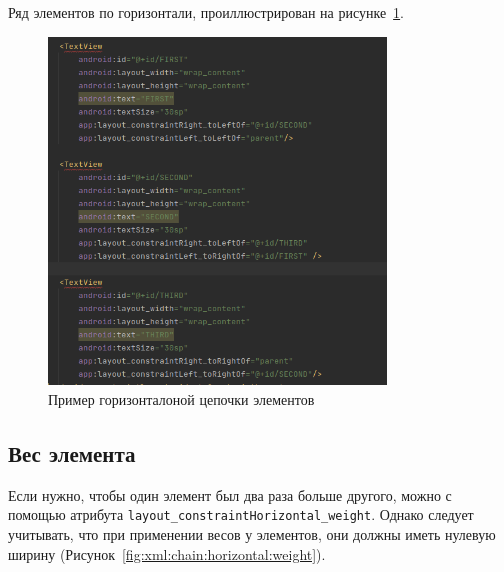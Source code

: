 Ряд элементов по горизонтали, проиллюстрирован на
рисунке~\ref{fig:xml:chain:horizontal}.

\begin{figure}[h!tp]
	\centering
	\includegraphics[width=0.8\textwidth]{Screenshot from 2023-03-12 15-46-21.png}
	\caption{Пример горизонталоной цепочки элементов}
	\label{fig:xml:chain:horizontal}
\end{figure}

\subsection{Вес элемента}
Если нужно, чтобы один элемент был два раза больше другого, можно с
помощью атрибута \texttt{layout\_constraintHorizontal\_weight}. Однако следует
учитывать, что при применении весов у элементов, они должны иметь
нулевую ширину (Рисунок~\ref{fig:xml:chain:horizontal:weight}).

